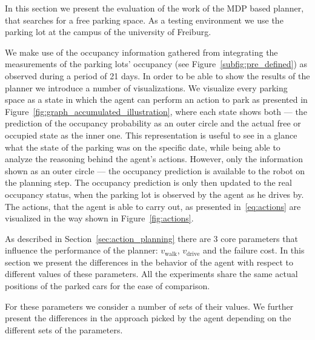 In this section we present the evaluation of the work of the MDP based
planner, that searches for a free parking space. As a testing environment we
use the parking lot at the campus of the university of Freiburg.

We make use of the occupancy information gathered from integrating the
measurements of the parking lots' occupancy (see
Figure~\ref{subfig:pre_defined}) as observed during a period of 21 days. In
order to be able to show the results of the planner we introduce a number of
visualizations. We visualize every parking space as a state in which the agent
can perform an action to park as presented in
Figure~\ref{fig:graph_accumulated_illustration}, where each state shows both
--- the prediction of the occupancy probability as an outer circle and the
actual free or occupied state as the inner one. This representation is useful
to see in a glance what the state of the parking was on the specific date,
while being able to analyze the reasoning behind the agent's actions. However,
only the information shown as an outer circle --- the occupancy prediction is
available to the robot on the planning step. The occupancy prediction is only
then updated to the real occupancy status, when the parking lot is observed by
the agent as he drives by. The actions, that the agent is able to carry out,
as presented in~\eqref{eq:actions} are visualized in the way shown in
Figure~\ref{fig:actions}.

As described in Section~\ref{sec:action_planning} there are 3 core parameters
that influence the performance of the planner: $v_{\mathrm{walk}}$, $v_{\mathrm{drive}}$ and the
failure cost. In this section we present the differences in the behavior of
the agent with respect to different values of these parameters. All the
experiments share the same actual positions of the parked cars for the ease of
comparison.

For these parameters we consider a number of sets of their values. We further
present the differences in the approach picked by the agent depending on the
different sets of the parameters.

